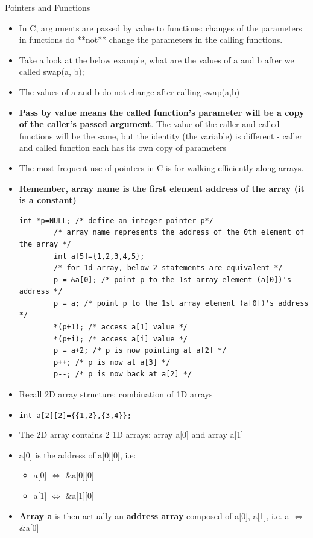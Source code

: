 \documentclass[10pt,t]{beamer}
\begin{document}
\begin{frame}{Pointers and Functions}
  \begin{itemize}
  \item In C, arguments are passed by
    value to functions: changes of the parameters in functions do **not**
    change the parameters in the calling functions.
  \item Take a look at the below example, what are the values of a and b after we
    called swap(a, b);
    
  \item The values of a and b do not change after calling swap(a,b)
  \item \textbf{Pass by value means the called function's parameter will be a
    copy of the caller's passed argument}. The value of the caller and
    called functions will be the same, but the identity (the variable) is
    different - caller and called function each has its own copy of
    parameters
    
  \item The most frequent use of pointers in C is for walking efficiently along
    arrays.
    \item \textbf{Remember, array name is the first element address of the array (it
      is a constant)}
      \begin{lstlisting}[basicstyle=\scriptsize\ttfamily]
        int *p=NULL; /* define an integer pointer p*/
        /* array name represents the address of the 0th element of the array */
        int a[5]={1,2,3,4,5};
        /* for 1d array, below 2 statements are equivalent */
        p = &a[0]; /* point p to the 1st array element (a[0])'s address */
        p = a; /* point p to the 1st array element (a[0])'s address */
        *(p+1); /* access a[1] value */
        *(p+i); /* access a[i] value */
        p = a+2; /* p is now pointing at a[2] */
        p++; /* p is now at a[3] */
        p--; /* p is now back at a[2] */
      \end{lstlisting}
    \item Recall 2D array structure: combination of 1D arrays
    \item[] \lstinline[basicstyle=\scriptsize\ttfamily]|int a[2][2]={{1,2},{3,4}};|
    \item The 2D array contains 2 1D arrays: array a[0] and array a[1]
    \item a[0] is the address of a[0][0], i.e:
      \begin{itemize}
      \item a[0] $\Leftrightarrow$ \&a[0][0]
      \item a[1] $\Leftrightarrow$ \&a[1][0]
      \end{itemize}
    \item \textbf{Array a} is then actually an \textbf{address array} composed of a[0], a[1],
      i.e. a $\Leftrightarrow$ \&a[0]

  \end{itemize}
\end{frame}
\end{document}
